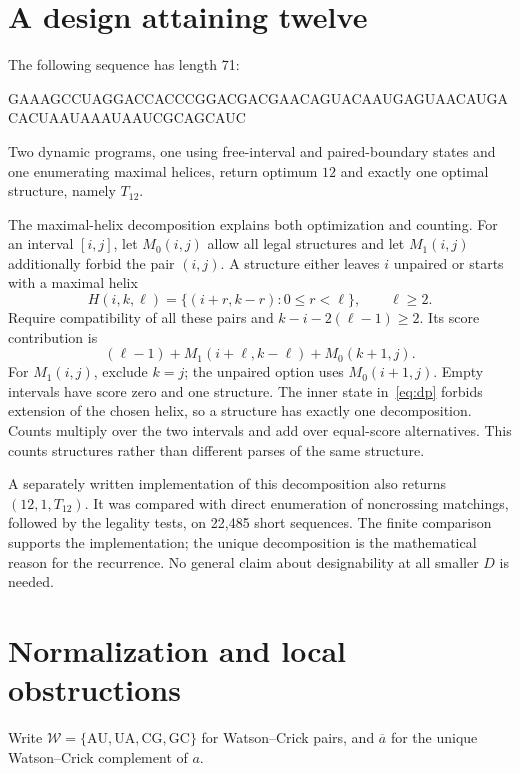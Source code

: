 \documentclass[11pt,a4paper]{article}
\theoremstyle{definition}
\newcommand{\WC}{\mathcal W}
\begin{document}
\section{A design attaining twelve}\label{sec:lower}
The following sequence has length 71:
\begin{center}\small\ttfamily
GAAAGCCUAGGACCACCCGGACGACGAACAGUACAAUGAGUAACAUGACACUAAUAAAUAAUCGCAGCAUC
\end{center}
Two dynamic programs, one using free-interval and paired-boundary
states and one enumerating maximal helices, return optimum $12$ and
exactly one optimal structure, namely $T_{12}$.

The maximal-helix decomposition explains both optimization and counting.
For an interval $[i,j]$, let $M_0(i,j)$ allow all legal structures and
let $M_1(i,j)$ additionally forbid the pair $(i,j)$. A structure either
leaves $i$ unpaired or starts with a maximal helix
\[
 H(i,k,\ell)=\{(i+r,k-r):0\leq r<\ell\},\qquad \ell\geq2.
\]
Require compatibility of all these pairs and
$k-i-2(\ell-1)\geq2$. Its score contribution is
\begin{equation}\label{eq:dp}
 (\ell-1)+M_1(i+\ell,k-\ell)+M_0(k+1,j).
\end{equation}
For $M_1(i,j)$, exclude $k=j$; the unpaired option uses
$M_0(i+1,j)$. Empty intervals have score zero and one structure.
The inner state in~\eqref{eq:dp} forbids extension of the chosen
helix, so a structure has exactly one decomposition. Counts multiply
over the two intervals and add over equal-score alternatives. This
counts structures rather than different parses of the same structure.

A separately written implementation of this decomposition also returns
$(12,1,T_{12})$. It was compared with direct enumeration of noncrossing
matchings, followed by the legality tests, on 22,485 short sequences.
The finite comparison supports the implementation; the unique
decomposition is the mathematical reason for the recurrence. No
general claim about designability at all smaller $D$ is needed.

\section{Normalization and local obstructions}\label{sec:local}
Write $\WC=\{\mathrm{AU},\mathrm{UA},\mathrm{CG},\mathrm{GC}\}$ for
Watson--Crick pairs, and $\overline a$ for the unique Watson--Crick
complement of $a$.
\end{document}
